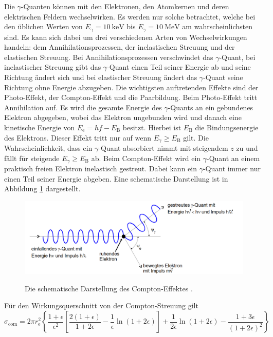 Die $\gamma$-Quanten können mit den Elektronen, den Atomkernen und deren elektrischen Feldern wechselwirken. Es werden nur solche betrachtet, welche bei den üblichen Werten von $E_\gamma = \SI{10}{\kilo\electronvolt}$ bis $E_\gamma = \SI{10}{\mega\electronvolt}$ \cite{V704} am wahrscheinlichsten sind. Es kann sich dabei um drei verschiedenen Arten von Wechselwirkungen handeln: dem Annihilationsprozessen, der inelastischen Streuung und der elastischen Streuung. Bei Annihilationsprozessen verschwindet das $\gamma$-Quant, bei inelastischer Streuung gibt das $\gamma$-Quant einen Teil seiner Energie ab und seine Richtung ändert sich und bei elastischer Streuung ändert das $\gamma$-Quant seine Richtung ohne Energie abzugeben. Die wichtigsten auftretenden Effekte sind der Photo-Effekt, der Compton-Effekt und die Paarbildung.
Beim Photo-Effekt tritt Annihilation auf. Es wird die gesamte Energie des $\gamma$-Quants an ein gebundenes Elektron abgegeben, wobei das Elektron ungebunden wird und danach eine kinetische Energie von $E_\text{e} = h f - E_\text{B}$ besitzt. Hierbei ist $E_\text{B}$ die Bindungsenergie des Elektrons. Dieser Effekt tritt nur auf wenn $E_\gamma \ge E_\text{B}$ gilt. Die Wahrscheinlichkeit, dass ein $\gamma$-Quant absorbiert nimmt mit steigendem $z$ zu und fällt für steigende $E_\gamma \ge E_\text{B}$ ab. 
Beim Compton-Effekt wird ein $\gamma$-Quant an einem praktisch freien Elektron inelastisch gestreut. Dabei kann ein $\gamma$-Quant immer nur einen Teil seiner Energie abgeben. Eine schematische Darstellung ist in Abbildung \ref{fig:com} dargestellt.
\begin{figure}
	\centering
	\caption{Die schematische Darstellung des Compton-Effektes \cite{V704}.}
	\includegraphics[width=\linewidth,height=\textheight-170pt,keepaspectratio]{content/images/com.png}
	\label{fig:com}
\end{figure}
Für den Wirkungsquerschnitt von der Compton-Streuung gilt
\begin{equation}
\sigma_\text{com} = 2 \pi r_\text{e}^2 \left\{ \frac{1+\epsilon}{\epsilon^2} \left[\frac{2 (1+\epsilon)}{1+2 \epsilon} -\frac{1}{\epsilon} \ln(1+ 2 \epsilon)\right] + \frac{1}{2 \epsilon} \ln(1 + 2 \epsilon) -\frac{1 + 3 \epsilon}{(1+2\epsilon)^2} \right\}
\end{equation}
